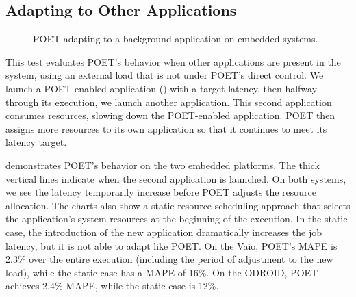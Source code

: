 \subsection{Adapting to Other Applications}

\begin{figure}[t]
  \centering
      
  \caption{POET adapting to a background application on embedded systems.}
  \label{fig:poet-embedded-multiapp}
\end{figure}

This test evaluates POET's behavior when other applications are present in the system, using an external load that is not under POET's direct control.
We launch a POET-enabled application () with a target latency, then halfway through its execution, we launch another application.
This second application consumes resources, slowing down the POET-enabled application.
POET then assigns more resources to its own application so that it continues to meet its latency target.

 demonstrates POET's behavior on the two embedded platforms.
The thick vertical lines indicate when the second application is launched.
On both systems, we see the latency temporarily increase before POET adjusts the resource allocation.
The charts also show a static resource scheduling approach that selects the application's system resources at the beginning of the execution.
In the static case, the introduction of the new application dramatically increases the job latency, but it is not able to adapt like POET.
On the Vaio, POET's MAPE is 2.3\% over the entire execution (including the period of adjustment to the new load), while the static case has a MAPE of 16\%.
On the ODROID, POET achieves 2.4\% MAPE, while the static case is 12\%.

